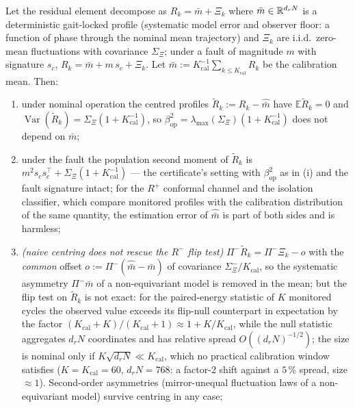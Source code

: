 \begin{lemma}
\label{lem:centring}
Let the residual element decompose as $R_k = \bar m + \Xi_k$ where
$\bar m \in \mathbb{R}^{d_r N}$ is a deterministic gait-locked profile (systematic
model error and observer floor: a function of phase through the nominal
mean trajectory) and $\Xi_k$ are i.i.d.\ zero-mean fluctuations with
covariance $\Sigma_\Xi$; under a fault of magnitude $m$ with signature
$s_c$, $R_k = \bar m + m\,s_c + \Xi_k$. Let $\hat{\bar m} :=
K_{\mathrm{cal}}^{-1}\sum_{k \le K_{\mathrm{cal}}} R_k$ be the calibration
mean. Then:
\begin{enumerate}
\item[(i)] under nominal operation the centred profiles $\tilde R_k := R_k -
\hat{\bar m}$ have $\mathbb{E}\tilde R_k = 0$ and
$\operatorname{Var}(\tilde R_k) = \Sigma_\Xi (1 + K_{\mathrm{cal}}^{-1})$, so
$\beta_{\mathrm{op}}^2 = \lambda_{\max}(\Sigma_\Xi)(1+K_{\mathrm{cal}}^{-1})$
does not depend on $\bar m$;
\item[(ii)] under the fault the population second moment of $\tilde R_k$ is
$m^2 s_c s_c^\top + \Sigma_\Xi(1+K_{\mathrm{cal}}^{-1})$ --- the certificate's
setting with $\beta_{\mathrm{op}}^2$ as in (i) and the fault signature
intact; for the $R^{+}$ conformal channel and the isolation classifier,
which compare monitored profiles with the calibration distribution of the
same quantity, the estimation error of $\hat{\bar m}$ is part of both sides
and is harmless;
\item[(iii)] \emph{(naive centring does not rescue the $R^{-}$ flip test)}
$\Pi^{-}\tilde R_k = \Pi^{-}\Xi_k - o$ with the \emph{common} offset
$o := \Pi^{-}(\hat{\bar m} - \bar m)$ of covariance $\Sigma^{-}_\Xi/K_{\mathrm{cal}}$,
so the systematic asymmetry $\Pi^{-}\bar m$ of a non-equivariant model is
removed in the mean; but the flip test on $\tilde R_k$ is not exact: for the
paired-energy statistic of $K$ monitored cycles the observed value exceeds
its flip-null counterpart in expectation by the factor
$(K_{\mathrm{cal}} + K)/(K_{\mathrm{cal}} + 1) \approx 1 + K/K_{\mathrm{cal}}$,
while the null statistic aggregates $d_r N$ coordinates and has relative
spread $O((d_r N)^{-1/2})$; the size is nominal only if
$K\sqrt{d_r N} \ll K_{\mathrm{cal}}$, which no practical calibration window
satisfies ($K = K_{\mathrm{cal}} = 60$, $d_r N = 768$: a factor-2 shift
against a $5\,\%$ spread, size $\approx 1$). Second-order asymmetries
(mirror-unequal fluctuation laws of a non-equivariant model) survive
centring in any case;

\end{enumerate}
\end{lemma}
